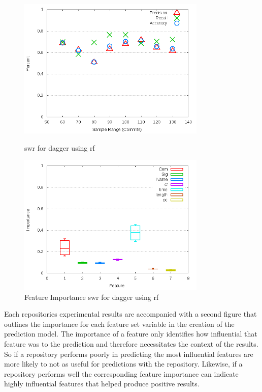 \begin{figure}[!ht]
    \centering
        \includegraphics[width=0.8\textwidth]{images/rf/test_1/dagger_sample_range}
        \caption{\gls{swr} for dagger using \gls{rf}}
        \label{fig:test_1_dagger_rf}

    \includegraphics[width=0.8\textwidth]{images/rf/test_1/dagger_importance}
        \caption{Feature Importance \gls{swr} for dagger using \gls{rf}}
        \label{fig:test_1_dagger_rf_importance}
\end{figure}

Each repositories experimental results are accompanied with a second figure that outlines the importance for each feature set variable in the creation of the prediction model. The importance of a feature only identifies how influential that feature was to the prediction and therefore necessitates the context of the results. So if a repository performs poorly in predicting the most influential features are more likely to not as useful for predictions with the repository. Likewise, if a repository performs well the corresponding feature importance can indicate highly influential features that helped produce positive results.

